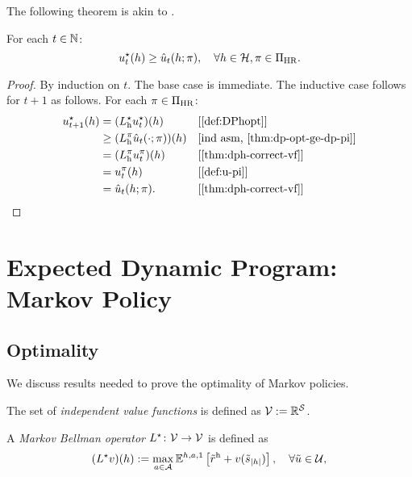 The following theorem is akin to \citep[theorem~4.3.2]{Puterman2005}.
\begin{theorem}\label{thm:dph-opt-vf-opt}
For each $t\in \mathbb{N}$:
  \[
    u^{\star}_t(h)
    \ge 
    \hat{u}_t(h; \pi), \quad \forall h\in \mathcal{H}, \pi\in \Pi_{\mathrm{HR}}.
  \]
\end{theorem}
\begin{proof}
  By induction on $t$. The base case is immediate. The inductive case follows for $t+1$ as follows. For each $\pi\in \Pi_{\mathrm{HR}}$:
  \begin{align*}
    u_{t+1}\opt(h)
    &= (L_{\mathrm{h}}\opt u_t\opt)(h) && \why{\cref{def:DPhopt}} \\
    &\ge (L_{\mathrm{h}}^{\pi} \hat{u}_t(\cdot; \pi))(h) && \why{ind asm, \cref{thm:dp-opt-ge-dp-pi}} \\
    &= (L_{\mathrm{h}}^{\pi} u_t^{\pi})(h) && \why{\cref{thm:dph-correct-vf}} \\
    &= u_t^{\pi}(h) && \why{\cref{def:u-pi}} \\
    &= \hat{u}_t(h; \pi). && \why{\cref{thm:dph-correct-vf}} \\
  \end{align*}
\end{proof}

\section{Expected Dynamic Program: Markov Policy}

\subsection{Optimality}
We discuss results needed to prove the optimality of Markov policies. 

\begin{definition} \label{def:Values}
  The set of \emph{independent value functions} is defined as $\mathcal{V} := \mathbb{R}^{\mathcal{S}}$.
\end{definition}

\begin{definition}\label{def:DPMopt}
A \emph{Markov Bellman operator} $L^{\star}\colon \mathcal{V} \to \mathcal{V}$ is defined as
\[
(L^{\star}  v)(h)  :=
\max_{a\in \mathcal{A}} \mathbb{E}^{h, a, 1} \left[ \tilde{r}^{\mathrm{h}} + v(\tilde{s}_{|h|}) \right], \quad \forall \tilde{u} \in \mathcal{U},
\]
\end{definition}

